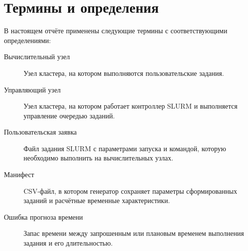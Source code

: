 \section*{Термины и определения}

В настоящем отчёте применены следующие термины с соответствующими определениями:

\begin{description}
    \item[Вычислительный узел] Узел кластера, на котором выполняются пользовательские задания.
    \item[Управляющий узел] Узел кластера, на котором работает контроллер SLURM и выполняется управление очередью заданий.
    \item[Пользовательская заявка] Файл задания SLURM с параметрами запуска и командой, которую необходимо выполнить на вычислительных узлах.
    \item[Манифест] CSV-файл, в котором генератор сохраняет параметры сформированных заданий и расчётные временные характеристики.
    \item[Ошибка прогноза времени] Запас времени между запрошенным или плановым временем выполнения задания и его длительностью.
\end{description}

\newpage
